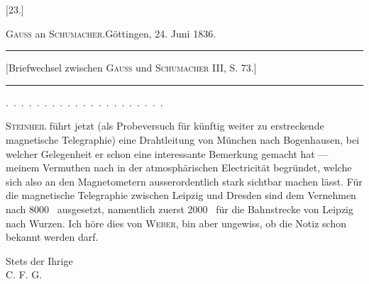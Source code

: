 \clearpage\begingroup{}

\begin{center}[23.]\end{center}
\begin{center}\textsc{Gauss} an \textsc{Schumacher}.\quad Göttingen, 24. Juni 1836.\end{center}
\begin{center}\begin{minipage}{.82\linewidth}\centering\hrule\vspace{3pt}
\small [Briefwechsel zwischen \textsc{Gauss} und \textsc{Schumacher} III, S. 73.]
\par\vspace{3pt}\hrule\end{minipage}\end{center}
\noindent .\ .\ .\ .\ .\ .\ .\ .\ .\ .\ .\ .\ .\ .\ .\ .\ .\ .\ .\ .\ .\par
\indent \textsc{Steinheil} führt jetzt (als Probeversuch für künftig weiter zu erstreckende
magnetische Telegraphie) eine Drahtleitung von München nach Bogenhausen,
bei welcher Gelegenheit er schon eine interessante Bemerkung gemacht hat —
meinem Vermuthen nach in der atmosphärischen Electricität begründet, welche
sich also an den Magnetometern ausserordentlich stark sichtbar machen lässt.
\clearpage{}
\indent Für die magnetische Telegraphie zwischen Leipzig und Dresden sind dem
Vernehmen nach 8000 \HistoricalCurrencyTwentyThreeA\ ausgesetzt, namentlich zuerst 2000 \HistoricalCurrencyTwentyThreeB\ für die Bahnstrecke
von Leipzig nach Wurzen. Ich höre dies von \textsc{Weber}, bin aber ungewiss,
ob die Notiz schon bekannt werden darf.
\begin{flushright}Stets der Ihrige\hspace*{.18\linewidth}\\[6pt]
C. F. G.\hspace*{.12\linewidth}\end{flushright}
\clearpage\endgroup
